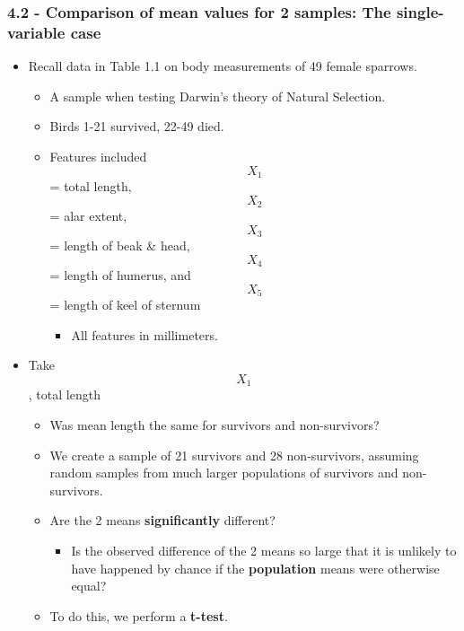\documentclass[]{article}
\providecommand{\tightlist}{%
  \setlength{\itemsep}{0pt}\setlength{\parskip}{0pt}}
\begin{document}
\hypertarget{comparison-of-mean-values-for-2-samples-the-single-variable-case}{%
\subsubsection{4.2 - Comparison of mean values for 2 samples: The
single-variable
case}\label{comparison-of-mean-values-for-2-samples-the-single-variable-case}}

\begin{itemize}
\tightlist
\item
  Recall data in Table 1.1 on body measurements of 49 female sparrows.

  \begin{itemize}
  \tightlist
  \item
    A sample when testing Darwin's theory of Natural Selection.
  \item
    Birds 1-21 survived, 22-49 died.
  \item
    Features included \[X_1\] = total length, \[X_2\] = alar extent,
    \[X_3\] = length of beak \& head, \[X_4\] = length of humerus, and
    \[X_5\] = length of keel of sternum

    \begin{itemize}
    \tightlist
    \item
      All features in millimeters.
    \end{itemize}
  \end{itemize}
\item
  Take \[X_1\], total length

  \begin{itemize}
  \tightlist
  \item
    Was mean length the same for survivors and non-survivors?
  \item
    We create a sample of 21 survivors and 28 non-survivors, assuming
    random samples from much larger populations of survivors and
    non-survivors.
  \item
    Are the 2 means \textbf{significantly} different?

    \begin{itemize}
    \tightlist
    \item
      Is the observed difference of the 2 means so large that it is
      unlikely to have happened by chance if the \textbf{population}
      means were otherwise equal?
    \end{itemize}
  \item
    To do this, we perform a \textbf{t-test}.
  \end{itemize}
\end{itemize}
\end{document}
